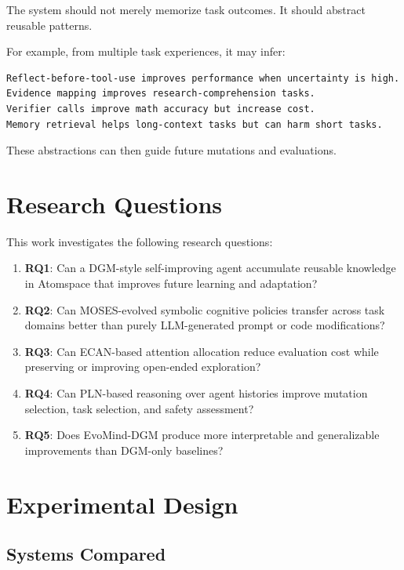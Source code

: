 \documentclass[11pt]{article}
\begin{document}
The system should not merely memorize task outcomes. It should abstract reusable patterns.

For example, from multiple task experiences, it may infer:

\begin{verbatim}
Reflect-before-tool-use improves performance when uncertainty is high.
Evidence mapping improves research-comprehension tasks.
Verifier calls improve math accuracy but increase cost.
Memory retrieval helps long-context tasks but can harm short tasks.
\end{verbatim}

These abstractions can then guide future mutations and evaluations.

\section{Research Questions}

This work investigates the following research questions:

\begin{enumerate}[leftmargin=*]
    \item \textbf{RQ1}: Can a DGM-style self-improving agent accumulate reusable knowledge in Atomspace that improves future learning and adaptation?
    \item \textbf{RQ2}: Can MOSES-evolved symbolic cognitive policies transfer across task domains better than purely LLM-generated prompt or code modifications?
    \item \textbf{RQ3}: Can ECAN-based attention allocation reduce evaluation cost while preserving or improving open-ended exploration?
    \item \textbf{RQ4}: Can PLN-based reasoning over agent histories improve mutation selection, task selection, and safety assessment?
    \item \textbf{RQ5}: Does EvoMind-DGM produce more interpretable and generalizable improvements than DGM-only baselines?
\end{enumerate}

\section{Experimental Design}

\subsection{Systems Compared}
\end{document}
